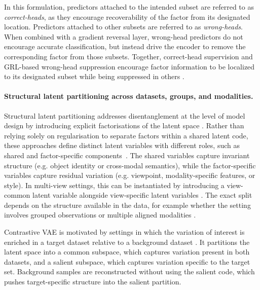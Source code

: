 In this formulation, predictors attached to the intended subset are referred to as \emph{correct-heads}, as they encourage recoverability of the factor from its designated location. 
Predictors attached to other subsets are referred to as \emph{wrong-heads}. 
When combined with a gradient reversal layer, wrong-head predictors do not encourage accurate classification, but instead drive the encoder to remove the corresponding factor from those subsets. 
Together, correct-head supervision and GRL-based wrong-head suppression encourage factor information to be localized to its designated subset while being suppressed in others \citep{attribute_disentanglement}.


\paragraph{Structural latent partitioning across datasets, groups, and modalities.}
Structural latent partitioning addresses disentanglement at the level of model design by introducing explicit factorisations of the latent space \citep{Bouchacourt_Tomioka_Nowozin_2018}. 
Rather than relying solely on regularisation to separate factors within a shared latent code, these approaches define distinct latent variables with different roles, such as shared and factor-specific components~\citep{chen2019weakly, suzuki2016joint}. 
The shared variables capture invariant structure (e.g. object identity or cross-modal semantics), while the factor-specific variables capture residual variation (e.g. viewpoint, modality-specific features, or style).
In multi-view settings, this can be instantiated by introducing a view-common latent variable alongside view-specific latent variables \citep{xu2021viewcommon}. 
The exact split depends on the structure available in the data, for example whether the setting involves grouped observations \citep{Bouchacourt_Tomioka_Nowozin_2018} or multiple aligned modalities \citep{xu2021viewcommon}.

Contrastive VAE is motivated by settings in which the variation of interest is enriched in
a target dataset relative to a background dataset \citep{abid2019cvae}. It partitions the
latent space into a common subspace, which captures variation present in both datasets, and
a salient subspace, which captures variation specific to the target set. Background
samples are reconstructed without using the salient code, which pushes target-specific
structure into the salient partition.

